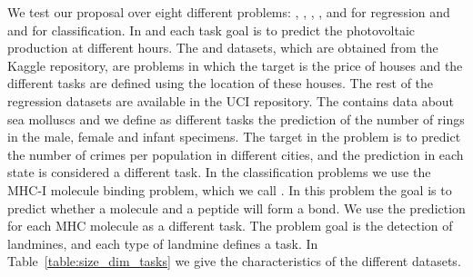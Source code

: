We test our proposal over eight different problems: , , , ,  and  for regression and  and  for classification.
In  and  each task goal is to predict the photovoltaic production at different hours.
The  and  datasets, which are obtained from the Kaggle repository, are problems in which the target is the price of houses and the different tasks are defined using the location of these houses.
The rest of the regression datasets are available in the UCI repository.
The  contains data about sea molluscs and we define as different tasks the prediction of the number of rings in the male, female and infant specimens.
The target in the  problem is to predict the number of crimes per population in different cities, and the prediction in each state is considered a different task. 
In the classification problems we use the MHC-I molecule binding problem, which we call . In this problem the goal is to predict whether a molecule and a peptide will form a bond. We use the prediction for each MHC molecule as a different task.
The 
problem goal is the detection of landmines, and each type of landmine defines a task.
In Table~\ref{table:size_dim_tasks} we give the characteristics of the different datasets.
